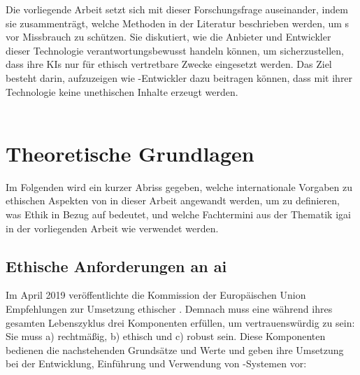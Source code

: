 \documentclass[hidelinks,12pt]{report}
\begin{document}
Die vorliegende Arbeit setzt sich mit dieser Forschungsfrage auseinander, indem sie zusammenträgt, welche Methoden in der Literatur beschrieben werden, um s vor Missbrauch zu schützen. Sie diskutiert, wie die Anbieter und Entwickler dieser Technologie verantwortungsbewusst handeln können, um sicherzustellen, dass ihre KIs nur für ethisch vertretbare Zwecke eingesetzt werden. Das Ziel besteht darin, aufzuzeigen wie -Entwickler dazu beitragen können, dass mit ihrer Technologie keine unethischen Inhalte erzeugt werden.\\\\


\begingroup
\let\clearpage\relax

\chapter{Theoretische Grundlagen}
Im Folgenden wird ein kurzer Abriss gegeben, welche internationale Vorgaben zu ethischen Aspekten von  in dieser Arbeit angewandt werden, um zu definieren, was Ethik in Bezug auf  bedeutet, und welche Fachtermini aus der Thematik \gls{igai} in der vorliegenden Arbeit wie verwendet werden.
\section{Ethische Anforderungen an \Gls{ai}}\label{def_ai}

Im April 2019 veröffentlichte die Kommission der Europäischen Union Empfehlungen zur Umsetzung ethischer  \cite{EUCommision}.
Demnach muss eine  während ihres gesamten Lebenszyklus drei Komponenten erfüllen, um vertrauenswürdig zu sein: Sie muss a) rechtmäßig, b) ethisch und c) robust sein. Diese Komponenten bedienen die nachstehenden Grundsätze und Werte und geben ihre Umsetzung bei der Entwicklung, Einführung und Verwendung von -Systemen vor:
\end{document}
